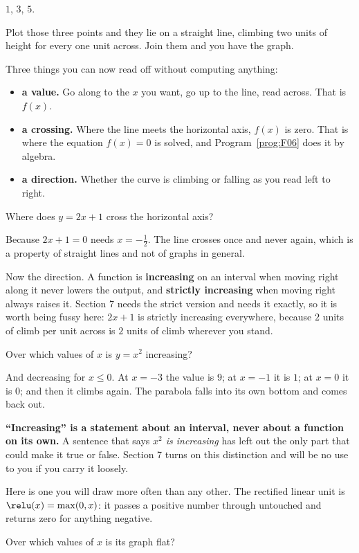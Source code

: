 \begin{fr}
\begin{ansblock}
$1$, $3$, $5$.
\end{ansblock}

Plot those three points and they lie on a straight line, climbing two units of
height for every one unit across. Join them and you have the graph.

Three things you can now read off without computing anything:

\begin{itemize}
\item \textbf{a value.} Go along to the $x$ you want, go up to the line, read
  across. That is $f(x)$.
\item \textbf{a crossing.} Where the line meets the horizontal axis, $f(x)$ is
  zero. That is where the equation $f(x) = 0$ is solved, and
  Program~\ref{prog:F06} does it by algebra.
\item \textbf{a direction.} Whether the curve is climbing or falling as you
  read left to right.
\end{itemize}

Where does $y = 2x + 1$ cross the horizontal axis?
\nextframe
\end{fr}

\begin{fr}
Because $2x + 1 = 0$ needs $x = -\frac{1}{2}$. The line crosses once and never
again, which is a property of straight lines and not of graphs in general.

Now the direction. A function is \textbf{increasing} on an interval when moving
right along it never lowers the output, and \textbf{strictly increasing} when
moving right always raises it. Section 7 needs the strict version and needs it
exactly, so it is worth being fussy here: $2x + 1$ is strictly increasing
everywhere, because $2$ units of climb per unit across is $2$ units of climb
wherever you stand.

Over which values of $x$ is $y = x^{2}$ increasing?
\nextframe
\end{fr}

\begin{fr}
And decreasing for $x \le 0$. At $x = -3$ the value is $9$; at $x = -1$ it is
$1$; at $x = 0$ it is $0$; and then it climbs again. The parabola falls into
its own bottom and comes back out.

\begin{warning}
\textbf{\enquote{Increasing} is a statement about an interval, never about a
function on its own.} A sentence that says \emph{$x^{2}$ is increasing} has
left out the only part that could make it true or false. Section 7 turns on
this distinction and will be no use to you if you carry it loosely.
\end{warning}

Here is one you will draw more often than any other. The rectified linear unit
is $\relu(x) = \max(0, x)$: it passes a positive number through
untouched and returns zero for anything negative.

Over which values of $x$ is its graph flat?
\nextframe
\end{fr}


